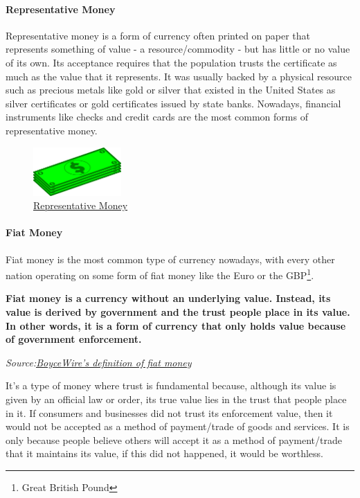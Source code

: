 \documentclass{article}
\newcommand\tab[1][1cm]{\hspace*{#1}}
\begin{document}
\paragraph{Representative Money}

\tab Representative money is a form of currency often printed on paper that represents something of value - a resource/commodity - but has little or no value of its own. Its acceptance requires that the population trusts the certificate as much as the value that it represents. It was usually backed by a physical resource such as precious metals like gold or silver that existed in the United States as silver certificates or gold certificates issued by state banks. Nowadays, financial instruments like checks and credit cards are the most common forms of representative money.

\begin{figure}[H]
    \begin{center}
        \includegraphics[width=0.3\textwidth]{images/dollar_bills.png}
        \caption{\href{https://lh3.googleusercontent.com/proxy/Kkpz0GitIhYF3RQMX4Rc9adthHDmpJeNtvSA395ZQ8QncVUxUo6ZsF15PNkorqYI5B5XXS18lon4rzLxxtKni9cXvCRebW0}{\underline{Representative Money}}}
    \end{center}
\end{figure}

\paragraph{Fiat Money}

\tab Fiat money is the most common type of currency nowadays, with every other nation operating on some form of fiat money like the Euro or the GBP\footnote{Great British Pound}.

\renewcommand{\epigraphflush}{center}
\epigraph{\textbf{Fiat money is a currency without an underlying value. Instead, its value is derived by government and the trust people place in its value. In other words, it is a form of currency that only holds value because of government enforcement.}}{\textit{Source:\href{https://boycewire.com/fiat-money-definition/#FiatVsRepresentative}{\underline{BoyceWire's definition of fiat money}}}}

It’s a type of money where trust is fundamental because, although its value is given by an official law or order, its true value lies in the trust that people place in it. If consumers and businesses did not trust its enforcement value, then it would not be accepted as a method of payment/trade of goods and services. It is only because people believe others will accept it as a method of payment/trade that it maintains its value, if this did not happened, it would be worthless.
\end{document}
